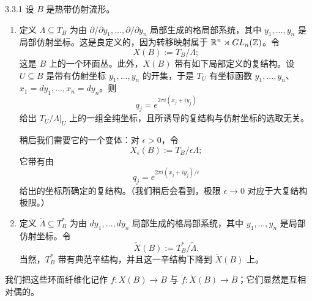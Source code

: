 \begin{definition}{3.3.1}
设 $B$ 是热带仿射流形。
\begin{enumerate}
\item 定义 $\Lambda\subseteq T_B$ 为由 $\partial/\partial y_1,\dots,\partial/\partial y_n$ 局部生成的格局部系统，其中 $y_1,\dots,y_n$ 是局部仿射坐标。这是良定义的，因为转移映射属于 $\mathbb{R}^n\rtimes GL_n(\mathbb{Z})$。令
\begin{equation*}
X(B):=T_B/\Lambda;
\end{equation*}
这是 $B$ 上的一个环面丛。此外，$X(B)$ 带有如下局部定义的复结构。设 $U\subseteq B$ 是带有仿射坐标 $y_1,\dots,y_n$ 的开集，于是 $T_U$ 有坐标函数 $y_1,\dots,y_n$、$x_1=dy_1,\dots,x_n=dy_n$。则
\begin{equation*}
q_j=e^{2\pi i(x_j+iy_j)}
\end{equation*}
给出 $T_U/\Lambda|_U$ 上的一组全纯坐标，且所诱导的复结构与仿射坐标的选取无关。

稍后我们需要它的一个变体：对 $\epsilon>0$，令
\begin{equation*}
X_\epsilon(B):=T_B/\epsilon\Lambda;
\end{equation*}
它带有由
\begin{equation*}
q_j=e^{2\pi i(x_j+iy_j)/\epsilon}
\end{equation*}
给出的坐标所确定的复结构。（我们稍后会看到，极限 $\epsilon\to0$ 对应于大复结构极限。）

\item 定义 $\check\Lambda\subseteq T_B^*$ 为由 $dy_1,\dots,dy_n$ 局部生成的格局部系统，其中 $y_1,\dots,y_n$ 是局部仿射坐标。令
\begin{equation*}
\check X(B):=T_B^*/\check\Lambda.
\end{equation*}
当然，$T_B^*$ 带有典范辛结构，并且这一辛结构下降到 $\check X(B)$ 上。\proofend
\end{enumerate}
\end{definition}



我们把这些环面纤维化记作 $f:X(B)\to B$ 与 $\check f:\check X(B)\to B$；它们显然是互相对偶的。

